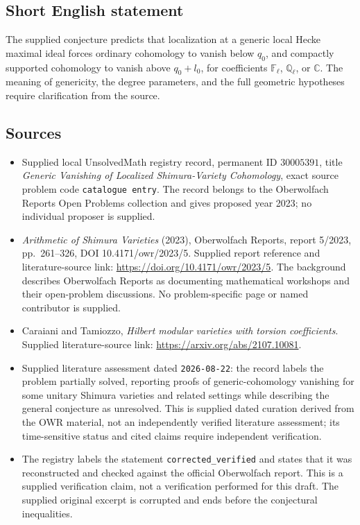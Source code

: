 \documentclass[11pt]{article}
\newcommand{\Q}{\mathbb{Q}}
\newcommand{\C}{\mathbb{C}}
\newcommand{\F}{\mathbb{F}}
\begin{document}
\subsection{Short English statement}
The supplied conjecture predicts that localization at a generic local Hecke maximal ideal forces ordinary cohomology to vanish below \(q_0\), and compactly supported cohomology to vanish above \(q_0+l_0\), for coefficients \(\F_\ell\), \(\Q_\ell\), or \(\C\). The meaning of genericity, the degree parameters, and the full geometric hypotheses require clarification from the source.
\subsection{Sources}
\begin{itemize}
\item Supplied local UnsolvedMath registry record, permanent ID \(30005391\), title \emph{Generic Vanishing of Localized Shimura-Variety Cohomology}, exact source problem code \texttt{catalogue entry}. The record belongs to the Oberwolfach Reports Open Problems collection and gives proposed year 2023; no individual proposer is supplied.
\item \emph{Arithmetic of Shimura Varieties} (2023), Oberwolfach Reports, report 5/2023, pp.~261--326, DOI 10.4171/owr/2023/5. Supplied report reference and literature-source link: \url{https://doi.org/10.4171/owr/2023/5}. The background describes Oberwolfach Reports as documenting mathematical workshops and their open-problem discussions. No problem-specific page or named contributor is supplied.
\item Caraiani and Tamiozzo, \emph{Hilbert modular varieties with torsion coefficients}. Supplied literature-source link: \url{https://arxiv.org/abs/2107.10081}.
\item Supplied literature assessment dated \texttt{2026-08-22}: the record labels the problem partially solved, reporting proofs of generic-cohomology vanishing for some unitary Shimura varieties and related settings while describing the general conjecture as unresolved. This is supplied dated curation derived from the OWR material, not an independently verified literature assessment; its time-sensitive status and cited claims require independent verification.
\item The registry labels the statement \texttt{corrected\_verified} and states that it was reconstructed and checked against the official Oberwolfach report. This is a supplied verification claim, not a verification performed for this draft. The supplied original excerpt is corrupted and ends before the conjectural inequalities.
\end{itemize}
\end{document}

